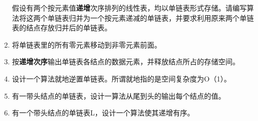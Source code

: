 \documentclass[lang=cn,newtx,10pt,scheme=chinese]{../../elegantbook}
\begin{document}
\begin{enumerate}
  假设有两个按元素值\textbf{递增}次序排列的线性表，均以单链表形式存储。请编写算法将这两个单链表归并为一个按元素递减的单链表，并要求利用原来两个单链表的结点存放归并后的单链表。
  
\vspace{5cm}
\item
  
  将单链表里的所有零元素移动到非零元素前面。
  
\vspace{5cm}
\item
  
  按\textbf{递增次序}输出单链表各结点的数据元素，并释放结点所占的存储空间。
  
\vspace{5cm}
\item
  
  设计一个算法就地逆置单链表。所谓就地指的是空间复杂度为O（1）。
  
\vspace{5cm}
\item
  
  有一带头结点的单链表，设计一算法从尾到头的输出每个结点的值。
  
\vspace{5cm}
\item
  
  有一个带头结点的单链表L，设计一个算法使其递增有序。
  

\end{enumerate}
\end{document}
